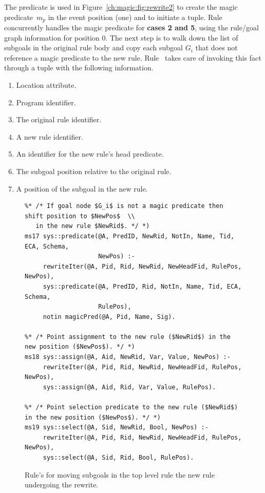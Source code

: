 The  predicate is used in Figure~\ref{ch:magic:fig:rewrite2} to
create the magic predicate~$m_p$ in the event position (one) and to initiate a
 tuple.  Rule~ concurrently handles the magic
predicate for {\bf cases 2 and 5}, using the rule/goal graph information for 
position $0$.  The next step is to walk down the list of subgoals in the
original rule body and copy each subgoal $G_{i}$ that does not reference a
magic predicate to the new rule.  Rule~ takes care of
invoking this fact through a  tuple with the following information.  
\begin{enumerate} 
  \ssp
  \item Location attribute.  
  \item Program identifier.
  \item The original rule identifier.
  \item A new rule identifier.
  \item An identifier for the new rule's head predicate.
  \item The subgoal position relative to the original rule.
  \item A position of the subgoal in the new rule.
\end{enumerate}

\begin{figure}[!t]
\ssp
\centering
\begin{lstlisting}
%* /* If goal node $G_i$ is not a magic predicate then shift position to $NewPos$  \\
   in the new rule $NewRid$. */ *)
ms17 sys::predicate(@A, PredID, NewRid, NotIn, Name, Tid, ECA, Schema,
                    NewPos) :-
     rewriteIter(@A, Pid, Rid, NewRid, NewHeadFid, RulePos, NewPos), 
     sys::predicate(@A, PredID, Rid, NotIn, Name, Tid, ECA, Schema, 
                    RulePos), 
     notin magicPred(@A, Pid, Name, Sig). 
	
%* /* Point assignment to the new rule ($NewRid$) in the new position ($NewPos$). */ *)
ms18 sys::assign(@A, Aid, NewRid, Var, Value, NewPos) :-
     rewriteIter(@A, Pid, Rid, NewRid, NewHeadFid, RulePos, NewPos),
     sys::assign(@A, Aid, Rid, Var, Value, RulePos).
	
%* /* Point selection predicate to the new rule ($NewRid$) in the new position ($NewPos$). */ *)
ms19 sys::select(@A, Sid, NewRid, Bool, NewPos) :-
     rewriteIter(@A, Pid, Rid, NewRid, NewHeadFid, RulePos, NewPos),
     sys::select(@A, Sid, Rid, Bool, RulePos).
\end{lstlisting}
\caption{\label{ch:magic:fig:rewrite3} Rule's for moving subgoals in the top level rule
the new rule undergoing the rewrite. }
\end{figure}


